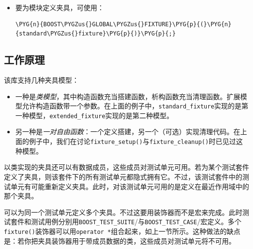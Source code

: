 \begin{itemize}

\item 要为模块定义夹具，可使用：



\begin{codeblockbg}
\begin{Verbatim}[commandchars=\\\{\},breaklines=true,breakanywhere=true,fontsize=\codefont,xleftmargin=17bp]
\PYG{n}{BOOST\PYGZus{}GLOBAL\PYGZus{}FIXTURE}\PYG{p}{(}\PYG{n}{standard\PYGZus{}fixture}\PYG{p}{)}\PYG{p}{;}
\end{Verbatim}
\end{codeblockbg}

\end{itemize}



\subsection{工作原理}



该库支持几种夹具模型：



\begin{itemize}
\item 一种是\textit{类模型}，其中构造函数充当搭建函数，析构函数充当清理函数。扩展模型允许构造函数带一个参数。在上面的例子中，\texttt{standard\_\allowbreak{}fixture}实现的是第一种模型，\texttt{extended\_\allowbreak{}fixture}实现的是第二种模型。



\item 另一种是\textit{一对自由函数}：一个定义搭建，另一个（可选）实现清理代码。在上面的例子中，我们在讨论\texttt{fixture\_\allowbreak{}setup()}与\texttt{fixture\_\allowbreak{}cleanup()}时已见过这种模型。

\end{itemize}



以类实现的夹具还可以有数据成员，这些成员对测试单元可用。若为某个测试套件定义了夹具，则该套件下的所有测试单元都隐式拥有它。不过，该测试套件中的测试单元有可能重新定义夹具。此时，对该测试单元可用的是定义在最近作用域中的那个夹具。



可以为同一个测试单元定义多个夹具。不过这要用装饰器而不是宏来完成。此时测试套件和测试用例分别用\texttt{BOOST\_\allowbreak{}TEST\_\allowbreak{}SUITE}/与\texttt{BOOST\_\allowbreak{}TEST\_\allowbreak{}CASE}/宏定义。多个\texttt{fixture()}装饰器可以用\texttt{operator *}组合起来，如上一节所示。这种做法的缺点是：若你把夹具装饰器用于带成员数据的类，这些成员对测试单元将不可用。


